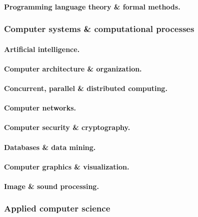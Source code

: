 \documentclass[oneside]{book}
\numberwithin{equation}{section}
\begin{document}
\paragraph{Programming language theory \& formal methods.}

\subsubsection{Computer systems \& computational processes}

\paragraph{Artificial intelligence.}

\paragraph{Computer architecture \& organization.}

\paragraph{Concurrent, parallel \& distributed computing.}

\paragraph{Computer networks.}

\paragraph{Computer security \& cryptography.}

\paragraph{Databases \& data mining.}

\paragraph{Computer graphics \& visualization.}

\paragraph{Image \& sound processing.}

\subsubsection{Applied computer science}
\end{document}
